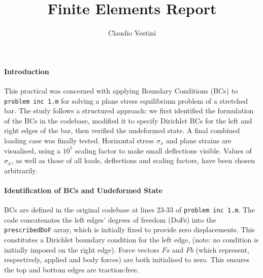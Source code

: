 \documentclass[hidelinks]{article}
\title{\vspace{-1cm} Finite Elements Report}
\author{\vspace{-2cm} Claudio Vestini}
\date{}
\begin{document}
\maketitle
%
\paragraph{Introduction}
This practical was concerned with applying Boundary Conditions (BCs) to \texttt{problem inc 1.m} for solving a plane stress equilibrium problem of a stretched bar.
The study follows a structured approach: we first identified the formulation of the BCs in the codebase, modified it to specify Dirichlet BCs for the left and right edges of the bar, then verified the undeformed state. A final combined loading case was finally tested.
Horizontal stress $\sigma_x$ and plane strains are visualised, using a $10^7$ scaling factor to make small deflections visible.
Values of $\sigma_x$, as well as those of all loads, deflections and scaling factors, have been chosen arbitrarily.

\paragraph{Identification of BCs and Undeformed State}
BCs are defined in the original codebase at lines 23-33 of \texttt{problem inc 1.m}. The code concatenates the left edges' degrees of freedom (DoFs) into the \texttt{prescribedDoF} array, which is initially fixed to provide zero displacements. This constitutes a Dirichlet boundary condition for the left edge, (note: no condition is initially imposed on the right edge). Force vectors $Fs$ and $Fb$ (which represent, respectively, applied and body forces) are both initialised to zero. This ensures the top and bottom edges are traction-free.
\end{document}
